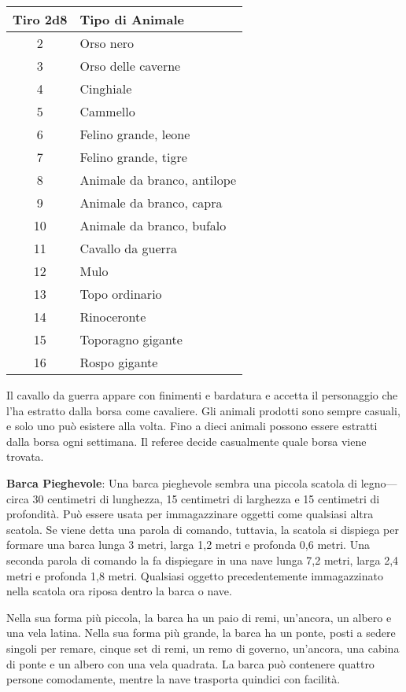 \documentclass{article}
\begin{document}
\begin{multicols}{2}
\begin{table}[h]
\centering
\begin{tabular}{|c|l|}
\hline
\textbf{Tiro 2d8} & \textbf{Tipo di Animale} \\
\hline
2 & Orso nero \\
3 & Orso delle caverne \\
4 & Cinghiale \\
5 & Cammello \\
6 & Felino grande, leone \\
7 & Felino grande, tigre \\
8 & Animale da branco, antilope \\
9 & Animale da branco, capra \\
10 & Animale da branco, bufalo \\
11 & Cavallo da guerra \\
12 & Mulo \\
13 & Topo ordinario \\
14 & Rinoceronte \\
15 & Toporagno gigante \\
16 & Rospo gigante \\
\hline
\end{tabular}

\end{table}

Il cavallo da guerra appare con finimenti e bardatura e accetta il personaggio che l'ha estratto dalla borsa come cavaliere. Gli animali prodotti sono sempre casuali, e solo uno può esistere alla volta. Fino a dieci animali possono essere estratti dalla borsa ogni settimana. Il referee decide casualmente quale borsa viene trovata.

\textbf{Barca Pieghevole}: Una barca pieghevole sembra una piccola scatola di legno—circa 30 centimetri di lunghezza, 15 centimetri di larghezza e 15 centimetri di profondità. Può essere usata per immagazzinare oggetti come qualsiasi altra scatola. Se viene detta una parola di comando, tuttavia, la scatola si dispiega per formare una barca lunga 3 metri, larga 1,2 metri e profonda 0,6 metri. Una seconda parola di comando la fa dispiegare in una nave lunga 7,2 metri, larga 2,4 metri e profonda 1,8 metri. Qualsiasi oggetto precedentemente immagazzinato nella scatola ora riposa dentro la barca o nave.

Nella sua forma più piccola, la barca ha un paio di remi, un'ancora, un albero e una vela latina. Nella sua forma più grande, la barca ha un ponte, posti a sedere singoli per remare, cinque set di remi, un remo di governo, un'ancora, una cabina di ponte e un albero con una vela quadrata. La barca può contenere quattro persone comodamente, mentre la nave trasporta quindici con facilità.


\end{multicols}
\end{document}
